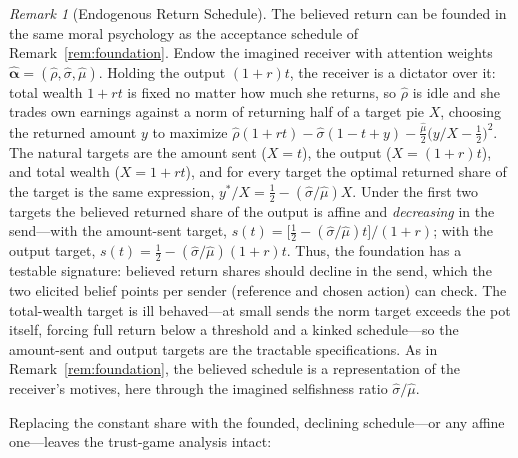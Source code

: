 \documentclass[11pt]{article}
\theoremstyle{plain}
\theoremstyle{remark}
\newtheorem{remark}{Remark}
\begin{document}
\begin{remark}[Endogenous Return Schedule]
\label{rem:return}
The believed return can be founded in the same moral psychology as the acceptance schedule of Remark~\ref{rem:foundation}. Endow the imagined receiver with attention weights $\hat{\boldsymbol{\alpha}}=(\hat\rho,\hat\sigma,\hat\mu)$. Holding the output $(1+r)t$, the receiver is a dictator over it: total wealth $1+rt$ is fixed no matter how much she returns, so $\hat\rho$ is idle and she trades own earnings against a norm of returning half of a target pie $X$, choosing the returned amount $y$ to maximize $\hat\rho(1+rt)-\hat\sigma(1-t+y)-\tfrac{\hat\mu}{2}\bigl(y/X-\tfrac12\bigr)^{2}$. The natural targets are the amount sent ($X=t$), the output ($X=(1+r)t$), and total wealth ($X=1+rt$), and for every target the optimal returned share of the target is the same expression, $y^{*}/X=\tfrac12-(\hat\sigma/\hat\mu)X$. Under the first two targets the believed returned share of the output is affine and \emph{decreasing} in the send---with the amount-sent target, $s(t)=\bigl[\tfrac12-(\hat\sigma/\hat\mu)t\bigr]/(1+r)$; with the output target, $s(t)=\tfrac12-(\hat\sigma/\hat\mu)(1+r)t$. Thus, the foundation has a testable signature: believed return shares should decline in the send, which the two elicited belief points per sender (reference and chosen action) can check. The total-wealth target is ill behaved---at small sends the norm target exceeds the pot itself, forcing full return below a threshold and a kinked schedule---so the amount-sent and output targets are the tractable specifications. As in Remark~\ref{rem:foundation}, the believed schedule is a representation of the receiver's motives, here through the imagined selfishness ratio $\hat\sigma/\hat\mu$.
\end{remark}

Replacing the constant share with the founded, declining schedule---or any affine one---leaves the trust-game analysis intact:
\end{document}
